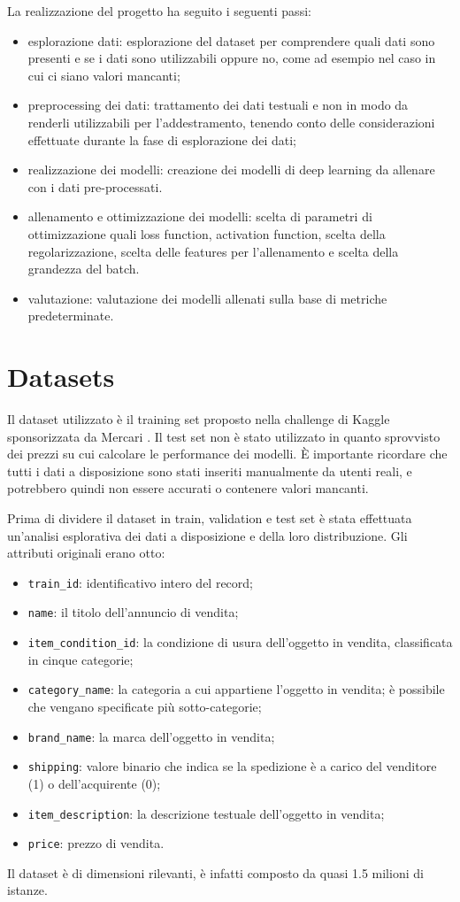 La realizzazione del progetto ha seguito i seguenti passi:
\begin{itemize}
    \item esplorazione dati: esplorazione del dataset per comprendere quali dati sono presenti e se i dati sono utilizzabili 
	oppure no, come ad esempio nel caso in cui ci siano valori mancanti;
    \item preprocessing dei dati: trattamento dei dati testuali e non in modo da renderli utilizzabili per l'addestramento, tenendo 
	conto delle considerazioni effettuate durante la fase di esplorazione dei dati;
    \item realizzazione dei modelli: creazione dei modelli di deep learning da allenare con i dati pre-processati.
    \item allenamento e ottimizzazione dei modelli: scelta di parametri di ottimizzazione quali loss function, 
	activation function, scelta della regolarizzazione, scelta delle features per l'allenamento e scelta della grandezza del batch.
    \item valutazione: valutazione dei modelli allenati sulla base di metriche predeterminate.
\end{itemize}

\section{Datasets}
Il dataset utilizzato è il training set proposto nella challenge di Kaggle sponsorizzata da Mercari \cite{kaggle}. Il test set non è 
stato utilizzato in quanto sprovvisto dei prezzi su cui calcolare le performance dei modelli. È importante ricordare 
che tutti i dati a disposizione sono stati inseriti manualmente da utenti reali, e potrebbero quindi non essere 
accurati o contenere valori mancanti.

Prima di dividere il dataset in train, validation e test set è stata effettuata un'analisi esplorativa dei dati 
a disposizione e della loro distribuzione. Gli attributi originali erano otto:
\begin{itemize}
    \item {\tt train\_id}: identificativo intero del record;
    \item {\tt name}: il titolo dell'annuncio di vendita;
    \item {\tt item\_condition\_id}: la condizione di usura dell'oggetto in vendita, classificata in cinque 
	categorie;
    \item {\tt category\_name}: la categoria a cui appartiene l'oggetto in vendita; è possibile che vengano 
	specificate più sotto-categorie;
    \item {\tt brand\_name}: la marca dell'oggetto in vendita;
    \item {\tt shipping}: valore binario che indica se la spedizione è a carico del venditore (1) o dell'acquirente (0);
    \item {\tt item\_description}: la descrizione testuale dell'oggetto in vendita;
    \item {\tt price}: prezzo di vendita.
\end{itemize}
Il dataset è di dimensioni rilevanti, è infatti composto da quasi 1.5 milioni di istanze.

